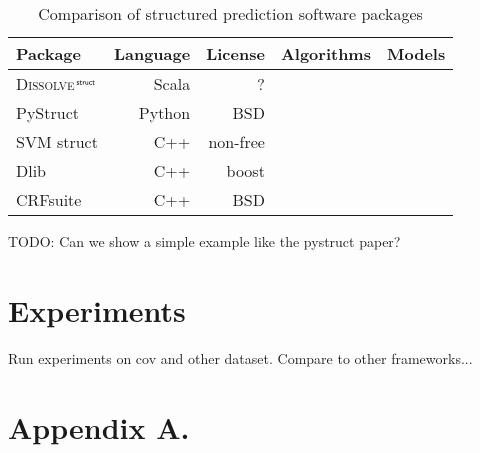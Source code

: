\documentclass[twoside,11pt]{article}
\newcommand{\algname}{\textsc{Dissolve}$\,^{\textsf{\tiny struct}}$\xspace}
\begin{document}
\begin{table}[h]
\caption{Comparison of structured prediction software packages}
\label{tab:datasets}
   \begin{center}
      \begin{tabular}{l| r | %
      r | r | r}
       \vspace{.25em}
    {\small\textbf{Package}} & {\small\textbf{Language}} & %
    {\small\textbf{License}} & {\small\textbf{Algorithms}} & {\small\textbf{Models}}\\
    \hline
    \algname & Scala & ?\\
    PyStruct & Python & BSD\\
	SVM struct & C++ & non-free \\
	Dlib & C++ & boost \\
	CRFsuite & C++ & BSD \\
      \end{tabular}
   \end{center}\vspace{-2mm}
\end{table}

TODO: Can we show a simple example like the pystruct paper?

\section{Experiments}

Run experiments on cov and other dataset. Compare to other frameworks...




\newpage

\appendix
\section*{Appendix A.}
\label{app:theorem}

\end{document}
